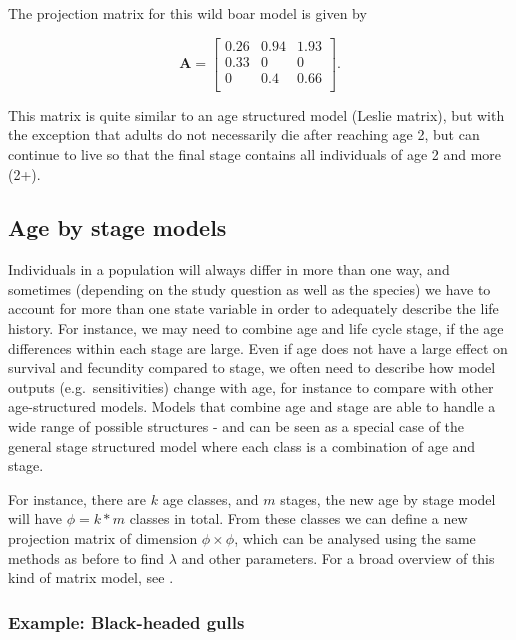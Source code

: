 \documentclass[
]{book}
\begin{document}
The projection matrix for this wild boar model is given by

\[
\mathbf{A}=\left[\begin{matrix} 0.26 & 0.94 &1.93  \\ 0.33&0  &0  \\ 0&0.4  &0.66  \\  \end{matrix}\right].
\]

This matrix is quite similar to an age structured model (Leslie matrix), but with the exception that adults do not necessarily die after reaching age 2, but can continue to live so that the final stage contains all individuals of age 2 and more (2+).

\hypertarget{agestage}{%
\subsection{Age by stage models}\label{agestage}}

Individuals in a population will always differ in more than one way, and sometimes (depending on the study question as well as the species) we have to account for more than one state variable in order to adequately describe the life history. For instance, we may need to combine age and life cycle stage, if the age differences within each stage are large. Even if age does not have a large effect on survival and fecundity compared to stage, we often need to describe how model outputs (e.g.~sensitivities) change with age, for instance to compare with other age-structured models. Models that combine age and stage are able to handle a wide range of possible structures - and can be seen as a special case of the general stage structured model where each class is a combination of age and stage.

For instance, there are \(k\) age classes, and \(m\) stages, the new age by stage model will have \(\phi=k*m\) classes in total. From these classes we can define a new projection matrix of dimension \(\phi \times \phi\), which can be analysed using the same methods as before to find \(\lambda\) and other parameters. For a broad overview of this kind of matrix model, see \citet{Caswell19}.

\hypertarget{example-black-headed-gulls}{%
\subsubsection*{Example: Black-headed gulls}\label{example-black-headed-gulls}}
\end{document}
